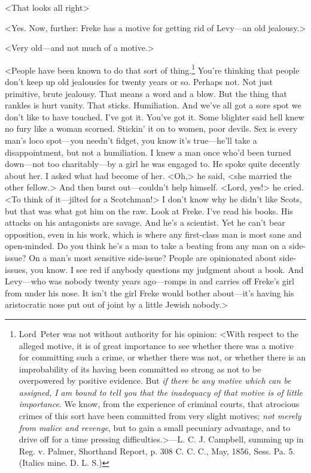 <That looks all right\longdash>

<Yes. Now, further: Freke has a motive for getting rid of Levy—an old jealousy.>

<Very old—and not much of a motive.>

<People have been known to do that sort of thing.\footnote{Lord~Peter was not without authority for his opinion: <With respect to the alleged motive, it is of great importance to see whether there was a motive for committing such a crime, or whether there was not, or whether there is an improbability of its having been committed so strong as not to be overpowered by positive evidence. But \textit{if there be any motive which can be assigned, I am bound to tell you that the inadequacy of that motive is of little importance}. We know, from the experience of criminal courts, that atrocious crimes of this sort have been committed from very slight motives; \textit{not merely from malice and revenge}, but to gain a small pecuniary advantage, and to drive off for a time pressing difficulties.>—L\@. C\@. J\@. Campbell, summing up in Reg. v. Palmer, Shorthand Report, p. 308 C\@. C\@. C\@., May, 1856, Sess. Pa. 5. (Italics mine. D\@. L\@. S\@.)}	You're thinking that people don't keep up old jealousies for twenty years or so. Perhaps not. Not just primitive, brute jealousy. That means a word and a blow. But the thing that rankles is hurt vanity. That sticks. Humiliation. And we've all got a sore spot we don't like to have touched. I've got it. You've got it. Some blighter said hell knew no fury like a woman scorned. Stickin' it on to women, poor devils. Sex is every man's loco spot—you needn't fidget, you know it's true—he'll take a disappointment, but not a humiliation. I knew a man once who'd been turned down—not too charitably—by a girl he was engaged to. He spoke quite decently about her. I asked what had become of her. <Oh,> he said, <she married the other fellow.> And then burst out—couldn't help himself. <Lord, yes!> he cried. <To think of it—jilted for a Scotchman!> I don't know why he didn't like Scots, but that was what got him on the raw. Look at Freke. I've read his books. His attacks on his antagonists are savage. And he's a scientist. Yet he can't bear opposition, even in his work, which is where any first-class man is most sane and open-minded. Do you think he's a man to take a beating from any man on a side-issue? On a man's most sensitive side-issue? People are opinionated about side-issues, you know. I see red if anybody questions my judgment about a book. And Levy—who was nobody twenty years ago—romps in and carries off Freke's girl from under his nose. It isn't the girl Freke would bother about—it's having his aristocratic nose put out of joint by a little Jewish nobody.>

